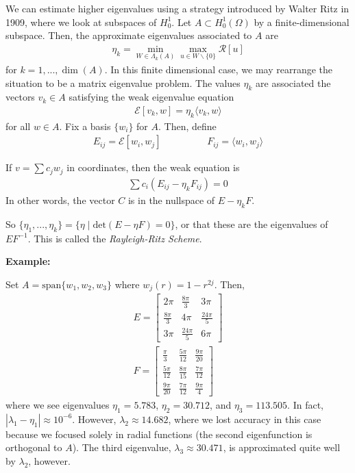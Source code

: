 \documentclass{article}
\begin{document}
	We can estimate higher eigenvalues using a strategy introduced by Walter Ritz in 1909, where we look at subspaces of $H^{1}_{0}$. Let $A \subset H^{1}_{0}(\Omega)$ by a finite-dimensional subspace. Then, the approximate eigenvalues associated to $A$ are 
	\begin{align*}
		\eta_{k} = \min_{W \in \Lambda_{k}(A)} \max_{u \in W \backslash \{0\}} \mathcal{R}[u]
	\end{align*}
	for $k=1,...,\dim(A)$. In this finite dimensional case, we may rearrange the situation to be a matrix eigenvalue problem. The values $\eta_k$ are associated the vectors $v_k \in A$ satisfying the weak eigenvalue equation 
	\begin{align*}
		\mathcal{E}[v_k,w] = \eta_{k} \langle v_k,w \rangle 
	\end{align*}
	for all $w \in A$. Fix a basis $\{w_{i}\}$ for $A$. Then, define 
	\begin{align*}
		E_{ij} = \mathcal{E}[w_i,w_j] \hspace{2cm} F_{ij} = \langle w_i,w_j \rangle 
	\end{align*} 
	
	If $v = \sum c_j w_j$ in coordinates, then the weak equation is 
	\begin{align*}
		\sum c_i ( E_{ij} - \eta_k F_{ij}) = 0
	\end{align*}
	In other words, the vector $C$ is in the nullspace of $E-\eta_k F$. 
	
	So $\{\eta_1,...,\eta_k\} = \{ \eta \mid \text{det}(E - \eta F) = 0\}$, or that these are the eigenvalues of $EF^{-1}$. This is called the \textit{Rayleigh-Ritz Scheme}. 
	
	\vspace{1cm}
	\textbf{Example:}
	
	Set $A = \text{span}\{w_1,w_2,w_3\}$ where $w_{j}(r) = 1-r^{2j}$. Then,
	\begin{align*}
		E = \begin{bmatrix}2\pi & \frac{8\pi}{3} & 3\pi \\ \frac{8\pi}{3} & 4\pi & \frac{24 \pi}{5} \\ 3\pi & \frac{24 \pi}{5} & 6 \pi \end{bmatrix} \\
		F = \begin{bmatrix}
			\frac{\pi}{3} & \frac{5\pi}{12} & \frac{9\pi}{20} \\ \frac{5\pi}{12} & \frac{8\pi}{15}&\frac{7\pi}{12} \\ \frac{9\pi}{20}&\frac{7\pi}{12}&\frac{9\pi}{4}
		\end{bmatrix}
	\end{align*}
	where we see eigenvalues $\eta_1 = 5.783$, $\eta_2 = 30.712$, and $\eta_3 = 113.505$. In fact, $|\lambda_1 - \eta_1|\approx 10^{-6}$. However, $\lambda_2 \approx 14.682$, where we lost accuracy in this case because we focused solely in radial functions (the second eigenfunction is orthogonal to $A$). The third eigenvalue, $\lambda_3 \approx 30.471$, is approximated quite well by $\lambda_2$, however. 
	
\end{document}
